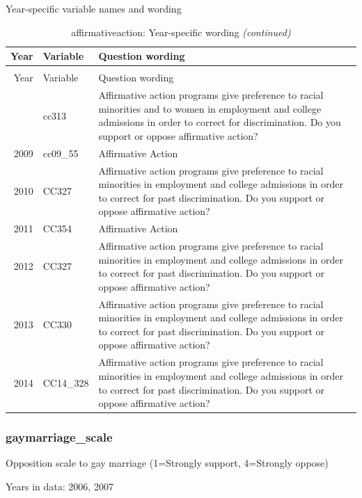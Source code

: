 \documentclass[12pt]{article}
\begin{document}
Year-specific variable names and wording

\begin{longtable}[t]{rl>{\raggedright\arraybackslash}p{10cm}}
\caption{\label{tab:unnamed-chunk-4}affirmativeaction: Year-specific wording}\\
\toprule
Year & Variable & Question wording\\
\midrule
\endfirsthead
\caption[]{affirmativeaction: Year-specific wording \textit{(continued)}}\\
\toprule
Year & Variable & Question wording\\
\midrule
\endhead
\
\endfoot
\bottomrule
\endlastfoot
2008 & cc313 & Affirmative action programs give preference to racial minorities and to women in employment and college admissions in order to correct for discrimination. Do you support or oppose affirmative action?\\
2009 & cc09\_55 & Affirmative Action\\
2010 & CC327 & Affirmative action programs give preference to racial minorities in employment and college admissions in order to correct for past discrimination. Do you support or oppose affirmative action?\\
2011 & CC354 & Affirmative Action\\
2012 & CC327 & Affirmative action programs give preference to racial minorities in employment and college admissions in order to correct for past discrimination. Do you support or oppose affirmative action?\\
2013 & CC330 & Affirmative action programs give preference to racial minorities in employment and college admissions in order to correct for past discrimination. Do you support or oppose affirmative action?\\
2014 & CC14\_328 & Affirmative action programs give preference to racial minorities in employment and college admissions in order to correct for past discrimination. Do you support or oppose affirmative action?\\*
\end{longtable}

\subsubsection{gaymarriage\_scale}\label{gaymarriage_scale}

Opposition scale to gay marriage (1=Strongly support, 4=Strongly oppose)

Years in data: 2006, 2007
\end{document}
